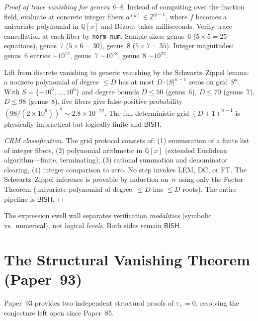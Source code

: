 \documentclass[11pt]{article}
\theoremstyle{plain}
\theoremstyle{definition}
\theoremstyle{remark}
\newcommand{\ZZ}{\mathbb{Z}}
\newcommand{\QQ}{\mathbb{Q}}
\newcommand{\BISH}{\mathsf{BISH}}
\begin{document}
\begin{proof}[Proof of trace vanishing for genera 6--8]
Instead of computing over the fraction field, evaluate at concrete integer fibers $a^{(k)} \in \ZZ^{g-1}$, where $f$ becomes a univariate polynomial in $\QQ[x]$ and B\'ezout takes milliseconds.  Verify trace cancellation at each fiber by \texttt{norm\_num}.  Sample sizes: genus~6 ($5 \times 5 = 25$ equations), genus~7 ($5 \times 6 = 30$), genus~8 ($5 \times 7 = 35$).  Integer magnitudes: genus~6 entries ${\sim}10^{12}$, genus~7 ${\sim}10^{18}$, genus~8 ${\sim}10^{22}$.

Lift from discrete vanishing to generic vanishing by the Schwartz--Zippel lemma: a nonzero polynomial of degree $\leq D$ has at most $D \cdot |S|^{n-1}$ zeros on grid $S^n$.  With $S = \{-10^6, \ldots, 10^6\}$ and degree bounds $D \leq 50$ (genus~6), $D \leq 70$ (genus~7), $D \leq 98$ (genus~8), five fibers give false-positive probability $(98 / (2 \times 10^6))^5 \sim 2.8 \times 10^{-22}$.  The full deterministic grid $(D+1)^{n-1}$ is physically impractical but logically finite and $\BISH$.

\emph{CRM classification.}  The grid protocol consists of: (1) enumeration of a finite list of integer fibers, (2) polynomial arithmetic in $\QQ[x]$ (extended Euclidean algorithm---finite, terminating), (3) rational summation and denominator clearing, (4) integer comparison to zero.  No step invokes LEM, DC, or FT.  The Schwartz--Zippel inference is provable by induction on~$n$ using only the Factor Theorem (univariate polynomial of degree~$\leq D$ has $\leq D$ roots).  The entire pipeline is $\BISH$.
\end{proof}

The expression swell wall separates verification \emph{modalities} (symbolic vs.\ numerical), not logical \emph{levels}.  Both sides remain $\BISH$.


\section{The Structural Vanishing Theorem (Paper~93)}\label{sec:structural}

Paper~93 \cite{p93} provides two independent structural proofs of
$\tau_+ = 0$, resolving the conjecture left open since Paper~85.
\end{document}
